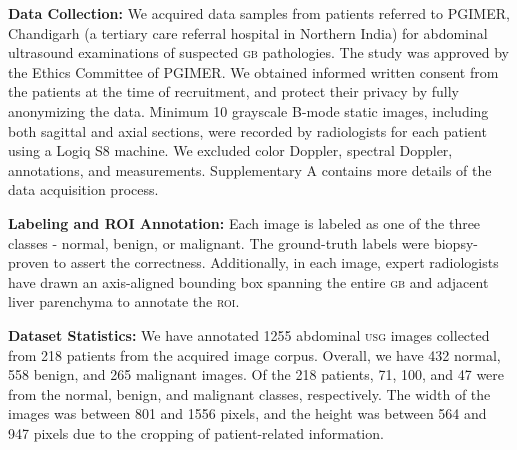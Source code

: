 \documentclass[10pt,twocolumn,letterpaper]{article}
\def\usg{\textsc{usg}\xspace}
\def\gb{\textsc{gb}\xspace}
\def\roi{\textsc{roi}\xspace}
\newcommand{\myfirstpara}[1]{\noindent \textbf{#1:}}
\newcommand{\mypara}[1]{\vspace{0.1em} \myfirstpara{#1}}
\begin{document}
\myfirstpara{Data Collection}
We acquired data samples from patients referred to PGIMER, Chandigarh (a tertiary care referral hospital in Northern India) for abdominal ultrasound examinations of suspected \gb pathologies. The study was approved by the Ethics Committee of PGIMER. We obtained informed written consent from the patients at the time of recruitment, and protect their privacy by fully anonymizing the data. Minimum 10 grayscale B-mode static images, including both sagittal and axial sections, were recorded by radiologists for each patient using a Logiq S8 machine. We excluded color Doppler, spectral Doppler, annotations, and measurements. Supplementary A contains more details of the data acquisition process.

\mypara{Labeling and ROI Annotation}
Each image is labeled as one of the three classes - normal, benign, or malignant. The ground-truth labels were biopsy-proven to assert the correctness. Additionally, in each image, expert radiologists have drawn an axis-aligned bounding box spanning the entire \gb and adjacent liver parenchyma to annotate the \roi. 

\mypara{Dataset Statistics}
We have annotated 1255 abdominal \usg images collected from 218 patients from the acquired image corpus. Overall, we have 432 normal, 558 benign, and 265 malignant images. Of the 218 patients, 71, 100, and 47 were from the normal, benign, and malignant classes, respectively. The width of the images was between 801 and 1556 pixels, and the height was between 564 and 947 pixels due to the cropping of patient-related information. 
\end{document}

